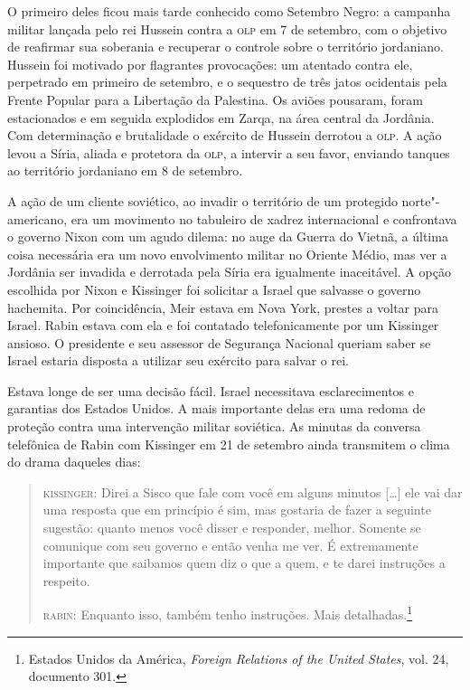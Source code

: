 O primeiro deles ficou mais tarde conhecido como Setembro Negro: a
campanha militar lançada pelo rei Hussein contra a \textsc{olp} em 7 de setembro,
com o objetivo de reafirmar sua soberania e recuperar o controle sobre o
território jordaniano. Hussein foi motivado por flagrantes provocações:
um atentado contra ele, perpetrado em primeiro de setembro, e o
sequestro de três jatos ocidentais pela Frente Popular para a Libertação
da Palestina. Os aviões pousaram, foram estacionados e em seguida
explodidos em Zarqa, na área central da Jordânia. Com determinação e
brutalidade o exército de Hussein derrotou a \textsc{olp}. A ação levou a Síria,
aliada e protetora da \textsc{olp}, a intervir a seu favor, enviando tanques ao
território jordaniano em 8 de setembro.

A ação de um cliente soviético, ao invadir o território de um protegido
norte"-americano, era um movimento no tabuleiro de xadrez internacional
e confrontava o governo Nixon com um agudo dilema: no auge da Guerra do
Vietnã, a última coisa necessária era um novo envolvimento militar no
Oriente Médio, mas ver a Jordânia ser invadida e derrotada pela Síria
era igualmente inaceitável. A opção escolhida por Nixon e Kissinger foi
solicitar a Israel que salvasse o governo hachemita. Por coincidência,
Meir estava em Nova York, prestes a voltar para Israel. Rabin estava
com ela e foi contatado telefonicamente por um Kissinger ansioso. O
presidente e seu assessor de Segurança Nacional queriam saber se Israel
estaria disposta a utilizar seu exército para salvar o rei.

Estava longe de ser uma decisão fácil. Israel necessitava
esclarecimentos e garantias dos Estados Unidos. A mais importante delas era uma
redoma de proteção contra uma intervenção militar soviética. As minutas
da conversa telefônica de Rabin com Kissinger em 21 de setembro ainda
transmitem o clima do drama daqueles dias:

\begin{quote}
\textsc{kissinger}: Direi a Sisco que fale com você em alguns minutos {[}\ldots{}{]} ele vai
dar uma resposta que em princípio é sim, mas gostaria de fazer a
seguinte sugestão: quanto menos você disser e responder, melhor. Somente
se comunique com seu governo e então venha me ver. É extremamente
importante que saibamos quem diz o que a quem, e te darei instruções a
respeito.

\textsc{rabin}: Enquanto isso, também tenho instruções. Mais
detalhadas.\footnote{Estados Unidos da América, \textit{Foreign Relations of the United States}, vol. 24, documento 301.}
\end{quote}

